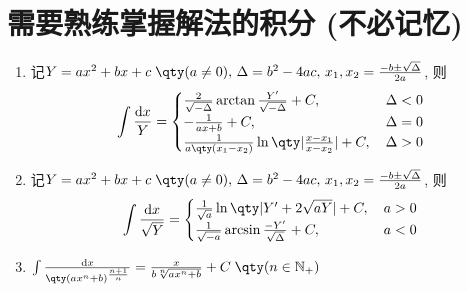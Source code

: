 \documentclass{ctexbook}
\newcommand*{\dif}{\mathop{}\!\mathrm{d}}
\begin{document}
{\section{需要熟练掌握解法的积分 (不必记忆) }
\begin{enumerate}
\item 记$Y=ax^{2}+bx+c\;\qty(a\ne0),\,\Delta=b^{2}-4ac,\,x_{1},x_{2}=\frac{-b\pm\sqrt{\Delta}}{2a}$, 则
\begin{align*}
\int\frac{\dif{x}}{Y}=\begin{cases}
\frac{2}{\sqrt{-\Delta}}\arctan{\frac{Y'}{\sqrt{-\Delta}}}+C,\,&\Delta<0\\
-\frac{1}{ax+b}+C,\,&\Delta=0\\
\frac{1}{a\qty(x_{1}-x_{2})}\ln\qty|\frac{x-x_{1}}{x-x_{2}}|+C,\,&\Delta>0
\end{cases}
\end{align*}
\item 记$Y=ax^{2}+bx+c\;\qty(a\ne0),\,\Delta=b^{2}-4ac,\,x_{1},x_{2}=\frac{-b\pm\sqrt{\Delta}}{2a}$, 则
\begin{align*}
\int\frac{\dif{x}}{\sqrt{Y}}=\begin{cases}
\frac{1}{\sqrt{a}}\ln\qty|Y'+2\sqrt{aY}|+C,\,&a>0\\
\frac{1}{\sqrt{-a}}\arcsin{\frac{-Y'}{\sqrt{\Delta}}}+C,\,&a<0
\end{cases}
\end{align*}
\item$\int\frac{\dif{x}}{\qty(ax^{n}+b)^{\frac{n+1}{n}}}=\frac{x}{b\sqrt[n]{ax^{n}+b}}+C\;\qty(n\in\mathbb{N_{+}})$
\end{enumerate}
}
\end{document}
